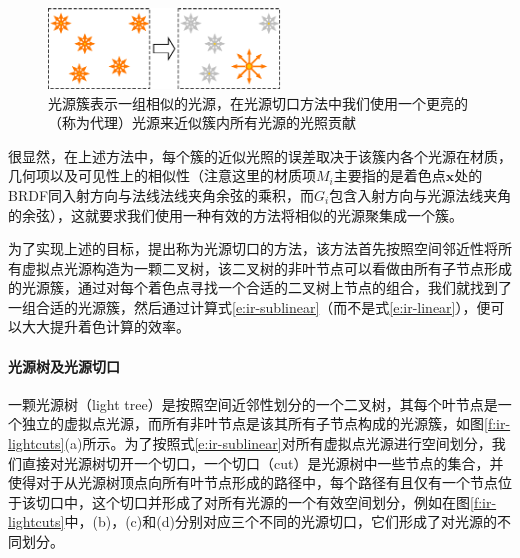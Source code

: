 \begin{figure}
	\sidecaption
	\includegraphics[width=0.55\textwidth]{figures/ir/light-cluster}
	\caption{光源簇表示一组相似的光源，在光源切口方法中我们使用一个更亮的（称为代理）光源来近似簇内所有光源的光照贡献}
	\label{f:ir-light-cluster}
\end{figure}

很显然，在上述方法中，每个簇的近似光照的误差取决于该簇内各个光源在材质，几何项以及可见性上的相似性（注意这里的材质项$M_i$主要指的是着色点$\mathbf{x}$处的BRDF同入射方向与法线法线夹角余弦的乘积，而$G_i$包含入射方向与光源法线夹角的余弦），这就要求我们使用一种有效的方法将相似的光源聚集成一个簇。

为了实现上述的目标，\cite{a:Lightcuts:AScalableApproachtoIllumination}提出称为光源切口的方法，该方法首先按照空间邻近性将所有虚拟点光源构造为一颗二叉树，该二叉树的非叶节点可以看做由所有子节点形成的光源簇，通过对每个着色点寻找一个合适的二叉树上节点的组合，我们就找到了一组合适的光源簇，然后通过计算式\ref{e:ir-sublinear}（而不是式\ref{e:ir-linear}），便可以大大提升着色计算的效率。




\paragraph{光源树及光源切口}
一颗光源树（light tree）是按照空间近邻性划分的一个二叉树，其每个叶节点是一个独立的虚拟点光源，而所有非叶节点是该其所有子节点构成的光源簇，如图\ref{f:ir-lightcuts}(a)所示。为了按照式\ref{e:ir-sublinear}对所有虚拟点光源进行空间划分，我们直接对光源树切开一个切口，一个切口（cut）是光源树中一些节点的集合，并使得对于从光源树顶点向所有叶节点形成的路径中，每个路径有且仅有一个节点位于该切口中，这个切口并形成了对所有光源的一个有效空间划分，例如在图\ref{f:ir-lightcuts}中，(b)，(c)和(d)分别对应三个不同的光源切口，它们形成了对光源的不同划分。

